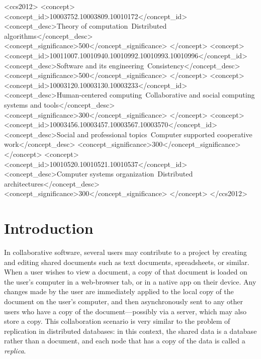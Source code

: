 \documentclass[sigconf]{acmart}
\begin{document}
\begin{CCSXML}
<ccs2012>
<concept>
<concept_id>10003752.10003809.10010172</concept_id>
<concept_desc>Theory of computation~Distributed algorithms</concept_desc>
<concept_significance>500</concept_significance>
</concept>
<concept>
<concept_id>10011007.10010940.10010992.10010993.10010996</concept_id>
<concept_desc>Software and its engineering~Consistency</concept_desc>
<concept_significance>500</concept_significance>
</concept>
<concept>
<concept_id>10003120.10003130.10003233</concept_id>
<concept_desc>Human-centered computing~Collaborative and social computing systems and tools</concept_desc>
<concept_significance>300</concept_significance>
</concept>
<concept>
<concept_id>10003456.10003457.10003567.10003570</concept_id>
<concept_desc>Social and professional topics~Computer supported cooperative work</concept_desc>
<concept_significance>300</concept_significance>
</concept>
<concept>
<concept_id>10010520.10010521.10010537</concept_id>
<concept_desc>Computer systems organization~Distributed architectures</concept_desc>
<concept_significance>300</concept_significance>
</concept>
</ccs2012>
\end{CCSXML}


\maketitle

\section{Introduction}

In collaborative software, several users may contribute to a project by creating and editing shared documents such as text documents, spreadsheets, or similar.
When a user wishes to view a document, a copy of that document is loaded on the user's computer in a web-browser tab, or in a native app on their device.
Any changes made by the user are immediately applied to the local copy of the document on the user's computer, and then asynchronously sent to any other users who have a copy of the document---possibly via a server, which may also store a copy.
This collaboration scenario is very similar to the problem of replication in distributed databases: in this context, the shared data is a database rather than a document, and each node that has a copy of the data is called a \emph{replica}.
\end{document}
